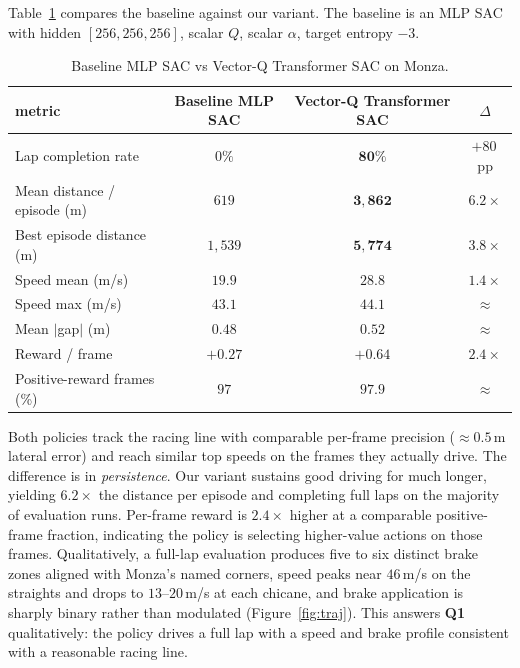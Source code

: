 \documentclass{article}
\begin{document}
Table~\ref{tab:main} compares the baseline against our variant. The
baseline is an MLP SAC with hidden $[256, 256, 256]$, scalar $Q$,
scalar $\alpha$, target entropy $-3$.

\begin{table}[h]
\centering
\footnotesize
\caption{Baseline MLP SAC vs Vector-Q Transformer SAC on Monza.}
\label{tab:main}
\begin{tabular}{@{}lccc@{}}
\toprule
metric & Baseline MLP SAC & Vector-Q Transformer SAC & $\Delta$ \\
\midrule
Lap completion rate                    & $0\%$        & $\mathbf{80\%}$         & $+80$\,pp \\
Mean distance / episode (m)            & $619$        & $\mathbf{3{,}862}$      & $6.2\times$ \\
Best episode distance (m)              & $1{,}539$    & $\mathbf{5{,}774}$      & $3.8\times$ \\
Speed mean (m/s)                       & $19.9$       & $\mathbf{28.8}$         & $1.4\times$ \\
Speed max (m/s)                        & $43.1$       & $44.1$                  & $\approx$ \\
Mean $|$gap$|$ (m)                     & $0.48$       & $0.52$                  & $\approx$ \\
Reward / frame                         & $+0.27$      & $\mathbf{+0.64}$        & $2.4\times$ \\
Positive-reward frames (\%)            & $97$         & $97.9$                  & $\approx$ \\
\bottomrule
\end{tabular}
\end{table}

Both policies track the racing line with comparable per-frame
precision ($\approx 0.5$\,m lateral error) and reach similar top
speeds on the frames they actually drive. The difference is in
\emph{persistence}. Our variant sustains good driving for much
longer, yielding $6.2\times$ the distance per episode and completing
full laps on the majority of evaluation runs. Per-frame reward is
$2.4\times$
higher at a comparable positive-frame fraction, indicating the
policy is selecting higher-value actions on those frames.
Qualitatively, a full-lap evaluation produces five to six distinct
brake zones aligned with Monza's named corners, speed peaks near
$46$\,m/s on the straights and drops to $13$--$20$\,m/s at each
chicane, and brake application is sharply binary rather than
modulated (Figure~\ref{fig:traj}). This answers \textbf{Q1}
qualitatively: the policy drives a full lap with a speed and brake
profile consistent with a reasonable racing line.
\end{document}
